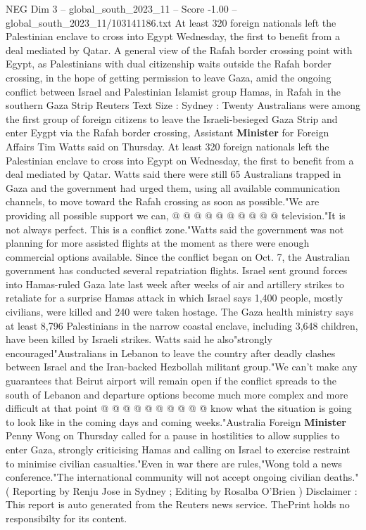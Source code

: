 \begin{textsample}{NEG Dim 3 – global\_south\_2023\_11 – Score -1.00 – global\_south\_2023\_11/103141186.txt}  \label{ex:f3_neg_109}
At least 320 foreign nationals left the Palestinian enclave to cross into Egypt Wednesday, the first to benefit from a deal mediated by Qatar.
A general view of the Rafah border crossing point with Egypt, as Palestinians with dual citizenship waits outside the Rafah border crossing, in the hope of getting permission to leave Gaza, amid the ongoing conflict between Israel and Palestinian Islamist group Hamas, in Rafah in the southern Gaza Strip Reuters Text Size : Sydney : Twenty Australians were among the first group of foreign citizens to leave the Israeli-besieged Gaza Strip and enter Eygpt via the Rafah border crossing, Assistant \textbf{Minister} for Foreign Affairs Tim Watts said on Thursday.
At least 320 foreign nationals left the Palestinian enclave to cross into Egypt on Wednesday, the first to benefit from a deal mediated by Qatar.
Watts said there were still 65 Australians trapped in Gaza and the government had urged them, using all available communication channels, to move toward the Rafah crossing as soon as possible."We are providing all possible support we can, @ @ @ @ @ @ @ @ @ @ television."It is not always perfect.
This is a conflict zone."Watts said the government was not planning for more assisted flights at the moment as there were enough commercial options available.
Since the conflict began on Oct. 7, the Australian government has conducted several repatriation flights.
Israel sent ground forces into Hamas-ruled Gaza late last week after weeks of air and artillery strikes to retaliate for a surprise Hamas attack in which Israel says 1,400 people, mostly civilians, were killed and 240 were taken hostage.
The Gaza health ministry says at least 8,796 Palestinians in the narrow coastal enclave, including 3,648 children, have been killed by Israeli strikes.
Watts said he also"strongly encouraged"Australians in Lebanon to leave the country after deadly clashes between Israel and the Iran-backed Hezbollah militant group."We can't make any guarantees that Beirut airport will remain open if the conflict spreads to the south of Lebanon and departure options become much more complex and more difficult at that point @ @ @ @ @ @ @ @ @ @ know what the situation is going to look like in the coming days and coming weeks."Australia Foreign \textbf{Minister} Penny Wong on Thursday called for a pause in hostilities to allow supplies to enter Gaza, strongly criticising Hamas and calling on Israel to exercise restraint to minimise civilian casualties."Even in war there are rules,"Wong told a news conference."The international community will not accept ongoing civilian deaths."( Reporting by Renju Jose in Sydney ; Editing by Rosalba O'Brien ) Disclaimer : This report is auto generated from the Reuters news service.
ThePrint holds no responsibilty for its content.

\end{textsample}
